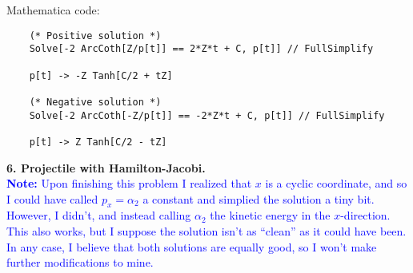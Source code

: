 \documentclass{article}
\theoremstyle{definition}
\newcommand{\al}{\alpha}
\begin{document}
\begin{enumerate}[label=(\alph*)]
	Mathematica code:
	\begin{lstlisting}
	(* Positive solution *)
	Solve[-2 ArcCoth[Z/p[t]] == 2*Z*t + C, p[t]] // FullSimplify
	
	p[t] -> -Z Tanh[C/2 + tZ]
	
	(* Negative solution *)
	Solve[-2 ArcCoth[-Z/p[t]] == -2*Z*t + C, p[t]] // FullSimplify
	
	p[t] -> Z Tanh[C/2 - tZ]
	\end{lstlisting}
	
\end{enumerate}




\noindent \textbf{6. Projectile with Hamilton-Jacobi.}\\

\noindent \textcolor{blue}{\textbf{Note:} Upon finishing this problem I realized that $x$ is a cyclic coordinate, and so I could have called $p_x = \al_2$ a constant and simplied the solution a tiny bit. However, I didn't, and instead calling $\al_2$ the kinetic energy in the $x$-direction. This also works, but I suppose the solution isn't as ``clean'' as it could have been. In any case, I believe that both solutions are equally good, so I won't make further modifications to mine. }\\
\end{document}
